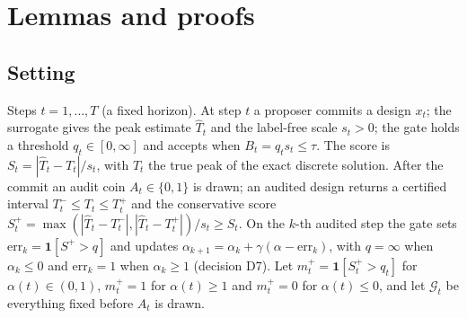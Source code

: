 
\chapter{Lemmas and proofs}
\label{app:lemmas}

\section{Setting}
Steps $t = 1,\dots,T$ (a fixed horizon). At step $t$ a proposer commits a design $x_t$; the
surrogate gives the peak estimate $\hat T_t$ and the label-free scale $s_t>0$; the gate holds a
threshold $q_t\in[0,\infty]$ and accepts when $B_t = q_t s_t \le \tau$. The score is
$S_t = |\hat T_t - T_t|/s_t$, with $T_t$ the true peak of the exact discrete solution. After the
commit an audit coin $A_t\in\{0,1\}$ is drawn; an audited design returns a certified interval
$T^-_t\le T_t\le T^+_t$ and the conservative score
$S^+_t = \max(|\hat T_t - T^-_t|,|\hat T_t - T^+_t|)/s_t \ge S_t$. On the $k$-th audited step
the gate sets $\mathrm{err}_k = \mathbf 1[S^+ > q]$ and updates
$\alpha_{k+1} = \alpha_k + \gamma(\alpha-\mathrm{err}_k)$, with $q = \infty$ when
$\alpha_k\le0$ and $\mathrm{err}_k = 1$ when $\alpha_k \ge 1$ (decision D7). Let
$m^+_t = \mathbf 1[S^+_t>q_t]$ for $\alpha(t)\in(0,1)$, $m^+_t=1$ for $\alpha(t)\ge1$ and
$m^+_t=0$ for $\alpha(t)\le0$, and let $\mathcal G_t$ be everything fixed before $A_t$ is drawn.

